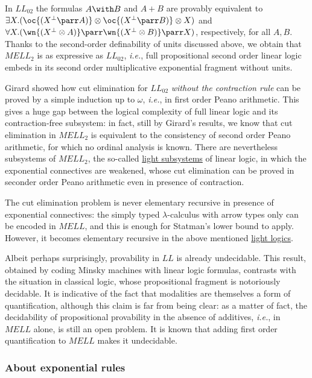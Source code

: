 In \(LL_{02}\) the formulas \(A\with B\) and \(A\plus B\) are provably
equivalent to
\(\exists X.(\oc{(X\orth\parr A)}\tens\oc{(X\orth\parr B)}\tens X)\) and
\(\forall X.(\wn{(X\orth\tens A)}\parr\wn{(X\orth \tens B)}\parr X)\),
respectively, for all \(A,B\). Thanks to the second-order definability
of units discussed above, we obtain that \(MELL_2\) is as expressive as
\(LL_{02}\), \emph{i.e.}, full propositional second order linear logic
embeds in its second order multiplicative exponential fragment without
units.

Girard showed how cut elimination for \(LL_{02}\) \emph{without the
contraction rule} can be proved by a simple induction up to \(\omega\),
\emph{i.e.}, in first order Peano arithmetic. This gives a huge gap
between the logical complexity of full linear logic and its
contraction-free subsystem: in fact, still by Girard's results, we know
that cut elimination in \(MELL_2\) is equivalent to the consistency of
second order Peano arithmetic, for which no ordinal analysis is known.
There are nevertheless subsystems of \(MELL_2\), the so-called
\href{Light_linear_logics}{light subsystems} of linear logic, in which
the exponential connectives are weakened, whose cut elimination can be
proved in seconder order Peano arithmetic even in presence of
contraction.

The cut elimination problem is never elementary recursive in presence of
exponential connectives: the simply typed \(\lambda\)-calculus with
arrow types only can be encoded in \(MELL\), and this is enough for
Statman's lower bound to apply. However, it becomes elementary recursive
in the above mentioned \href{Light_linear_logics}{light logics}.

Albeit perhaps surprisingly, provability in \(LL\) is already
undecidable. This result, obtained by coding Minsky machines with linear
logic formulas, contrasts with the situation in classical logic, whose
propositional fragment is notoriously decidable. It is indicative of the
fact that modalities are themselves a form of quantification, although
this claim is far from being clear: as a matter of fact, the
decidability of propositional provability in the absence of additives,
\emph{i.e.}, in \(MELL\) alone, is still an open problem. It is known
that adding first order quantification to \(MELL\) makes it undecidable.

\subsubsection{About exponential rules}\label{about-exponential-rules}

